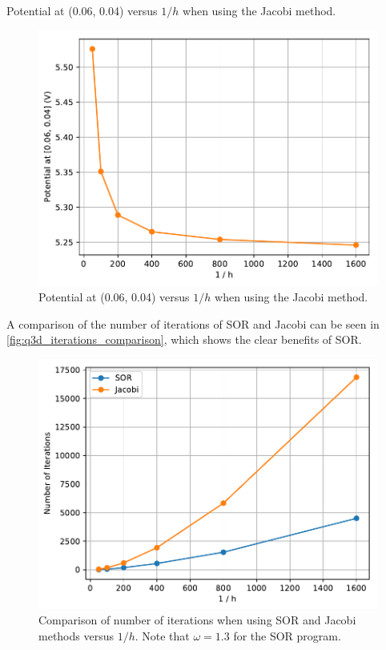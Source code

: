 \documentclass[a4paper,titlepage]{article}
\begin{document}
	\begin{table}[!htb]
		\centering
		\caption{Potential at (0.06, 0.04) versus $1/h$ when using the Jacobi method.}
		\label{table:q3d_potential}
	\end{table}

	\begin{figure}[!htb]
		\centering
		\includegraphics[width=\columnwidth]{plots/q3d_potential.pdf}
		\caption
		{Potential at (0.06, 0.04) versus $1/h$ when using the Jacobi method.}
		\label{fig:q3d_potential}
	\end{figure}

	A comparison of the number of iterations of SOR and Jacobi can be seen in \autoref{fig:q3d_iterations_comparison}, which shows the clear benefits of SOR.

	\begin{figure}[!htb]
		\centering
		\includegraphics[width=\columnwidth]{plots/q3d_iterations_comparison.pdf}
		\caption
		{Comparison of number of iterations when using SOR and Jacobi methods versus $1/h$. Note that $\omega=1.3$ for the SOR program.}
		\label{fig:q3d_iterations_comparison}
	\end{figure}
	
\end{document}
